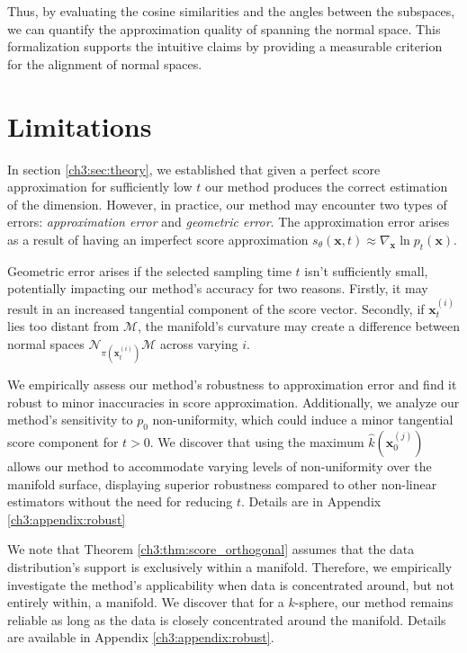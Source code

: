 Thus, by evaluating the cosine similarities and the angles between the subspaces, we can quantify the approximation quality of spanning the normal space. This formalization supports the intuitive claims by providing a measurable criterion for the alignment of normal spaces.

\section{Limitations}
\label{ch3:sec:limitations}

In section \ref{ch3:sec:theory}, we established that given a perfect score approximation for sufficiently low $t$ our method produces the correct estimation of the dimension. However, in practice, our method may encounter two types of errors: \textit{approximation error} and \textit{geometric error}. The approximation error arises as a result of having an imperfect score approximation $s_\theta(\textbf{x}, t) \approx \nabla_\textbf{x} \ln p_t(\textbf{x})$. 

Geometric error arises if the selected sampling time $t$ isn't sufficiently small, potentially impacting our method's accuracy for two reasons. Firstly, it may result in an increased tangential component of the score vector. Secondly, if $\textbf{x}^{(i)}_t$ lies too distant from $\mathcal{M}$, the manifold's curvature may create a difference between normal spaces $\mathcal{N}_{\pi(\textbf{x}_t^{(i)})}\mathcal{M}$ across varying $i$.

We empirically assess our method's robustness to approximation error and find it robust to minor inaccuracies in score approximation. Additionally, we analyze our method's sensitivity to $p_0$ non-uniformity, which could induce a minor tangential score component for $t>0$. We discover that using the maximum $\hat{k}(\textbf{x}^{(j)}_0)$ allows our method to accommodate varying levels of non-uniformity over the manifold surface, displaying superior robustness compared to other non-linear estimators without the need for reducing $t$. Details are in Appendix \ref{ch3:appendix:robust}

We note that Theorem \ref{ch3:thm:score_orthogonal} assumes that the data distribution's support is exclusively within a manifold. Therefore, we empirically investigate the method's applicability when data is concentrated around, but not entirely within, a manifold. We discover that for a $k$-sphere, our method remains reliable as long as the data is closely concentrated around the manifold. Details are available in Appendix \ref{ch3:appendix:robust}.

